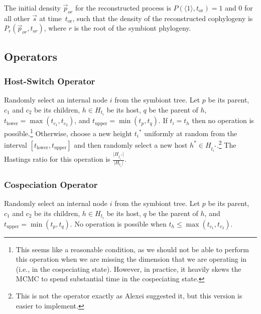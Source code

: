 \documentclass{article}
\begin{document}
            The initial density $\vec{p}_{or}$ for the reconstructed process is
            $P\left(\langle1\rangle, t_\text{or}\right) = 1$ and 0 for all
            other $\vec{s}$ at time~$t_\text{or}$, such that the density of the
            reconstructed cophylogeny is $P_r\left(\vec{p}_{or},
            t_{or}\right)$, where $r$ is the root of the symbiont phylogeny.


        \subsection*{Operators}

            \subsubsection*{Host-Switch Operator}

                Randomly select an internal node $i$ from the symbiont tree.
                Let $p$ be its parent, $c_1$ and $c_2$ be its children, $h \in
                H_{t_i}$ be its host, $q$ be the parent of $h$, $t_\text{lower}
                = \max\left(t_{c_1},t_{c_2}\right)$, and $t_\text{upper} =
                \min\left(t_p,t_q\right)$. If $t_i = t_h$ then no operation is
                possible.\footnote{This seems like a reasonable condition, as
                we should not be able to perform this operation when we are
                missing the dimension that we are operating in (i.e., in the
                cospeciating state). However, in practice, it heavily skews the
                MCMC to spend substantial time in the cospeciating state.}
                Otherwise, choose a new height ${t_i}^*$ uniformly at random
                from the interval $\left[t_\text{lower}, t_\text{upper}\right]$
                and then randomly select a new host $h^* \in
                H_{{t_i}^*}.$\footnote{This is not the operator exactly as
                Alexei suggested it, but this version is easier to implement.}
                The Hastings ratio for this operation is
                $\frac{\lvert{H_{{t_i}^*}}\rvert} {\lvert{H_{t_i}}\rvert}$.

            \subsubsection*{Cospeciation Operator}

                Randomly select an internal node $i$ from the symbiont tree.
                Let $p$ be its parent, $c_1$ and $c_2$ be its children, $h \in
                H_{t_i}$ be its host, $q$ be the parent of $h$, and
                $t_\text{upper} = \min\left(t_p,t_q\right)$. No operation is
                possible when $t_h \leq \max\left(t_{c_1},t_{c_2}\right)$.
\end{document}
